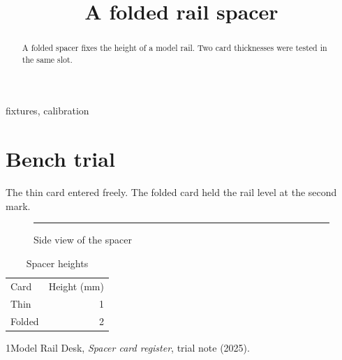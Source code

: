\documentclass[conference]{IEEEtran}
\begin{document}
\title{A folded rail spacer}\author{}\maketitle\begin{abstract}A folded spacer fixes the height of a model rail. Two card thicknesses were tested in the same slot.\end{abstract}\begin{IEEEkeywords}fixtures, calibration\end{IEEEkeywords}
\section{Bench trial}
The thin card entered freely. The folded card held the rail level at the second mark.
\begin{figure}[ht]\centering\rule{28mm}{2mm}\caption{Side view of the spacer}\end{figure}
\begin{table}[ht]\centering\begin{tabular}{lr}Card&Height (mm)\\Thin&1\\Folded&2\end{tabular}\caption{Spacer heights}\end{table}
\begin{thebibliography}{1}Model Rail Desk, \emph{Spacer card register}, trial note (2025).\end{thebibliography}
\end{document}
